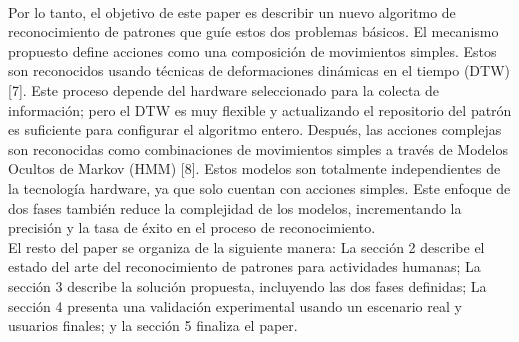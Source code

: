 \documentclass[10pt]{article}
\begin{document}
\\
Por lo tanto, el objetivo de este paper es describir un nuevo algoritmo de reconocimiento de patrones que guíe estos dos problemas básicos. El mecanismo propuesto define acciones como una composición de movimientos simples. Estos son reconocidos usando técnicas de deformaciones dinámicas en el tiempo (DTW) [7]. Este proceso depende del hardware seleccionado para la colecta de información; pero el DTW  es muy flexible y actualizando el repositorio del patrón es suficiente para configurar el algoritmo entero. Después, las acciones complejas son reconocidas como combinaciones de movimientos simples a través de Modelos Ocultos de Markov (HMM) [8]. Estos modelos son totalmente independientes de la tecnología hardware, ya que solo cuentan con acciones simples. Este enfoque de dos fases también reduce la complejidad de los modelos, incrementando la precisión y la tasa de éxito en el proceso de reconocimiento.
\\
El resto del paper se organiza de la siguiente manera: La sección 2 describe el estado del arte del reconocimiento de patrones para actividades humanas; La sección 3 describe la solución propuesta, incluyendo las dos fases definidas; La sección 4 presenta una validación experimental usando un escenario real y usuarios finales; y la sección 5 finaliza el paper.

\section{}
\end{document}
